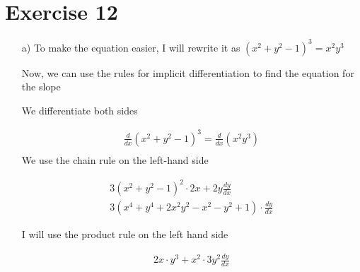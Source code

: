 \documentclass[11pt]{article}
\begin{document}
\section*{Exercise 12}
\begin{enumerate}
  \item[a)]
        To make the equation easier, I will rewrite it as $(x^{2}+y^{2}-1)^{3}=x^{2}y^{3}$

        Now, we can use the rules for implicit differentiation to find the equation for the slope

        We differentiate both sides

\begin{gather*}
  \frac{d}{dx}(x^{2}+y^{2}-1)^{3}=\frac{d}{dx}(x^{2}y^{3}) \\
\end{gather*}
        We use the chain rule on the left-hand side

\begin{gather*}
  3(x^{2}+y^{2}-1)^{2} \cdot 2x+2y \frac{dy}{dx} \\
  3(x^{4}+y^{4}+2x^{2}y^{2}-x^{2}-y^{2}+1) \cdot \frac{dy}{dx}
\end{gather*}

        I will use the product rule on the left hand side

\begin{gather*}
2x \cdot y^{3} + x^{2} \cdot 3y^{2} \frac{dy}{dx}
\end{gather*}

\end{enumerate}
\end{document}
